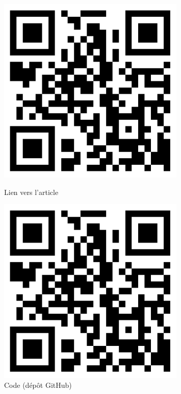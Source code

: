 \documentclass[11pt,aspectratio=169]{beamer}
\begin{document}
\begin{frame}[plain]
\begin{center}
        \begin{figure}[h]
            \centering
            \begin{minipage}{0.45\textwidth}
                \centering
                \includegraphics[width=0.8\textwidth]{qrcode.jpg}
                \caption{Lien vers l'article}
            \end{minipage}
            \hspace{0.05\textwidth}
            \begin{minipage}{0.45\textwidth}
                \centering
                \includegraphics[width=0.8\textwidth]{qrcode.jpg}
                \caption{Code (dépôt GitHub)}
            \end{minipage}
        \end{figure}
    \end{center}
\end{frame}
\end{document}
